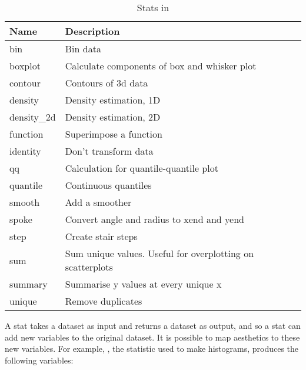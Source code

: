 \begin{table}
  \begin{center}
  \begin{tabular}{lp{3in}}
    \toprule
    Name & Description \\
    \midrule
    bin          & Bin data                                                   \\
    boxplot      & Calculate components of box and whisker plot               \\
    contour      & Contours of 3d data                                        \\
    density      & Density estimation, 1D                                     \\
    density\_2d & Density estimation, 2D                                     \\
    function     & Superimpose a function                                     \\
    identity     & Don't transform data                                       \\
    qq           & Calculation for quantile-quantile plot                     \\
    quantile     & Continuous quantiles                                       \\
    smooth       & Add a smoother                                             \\
    spoke        & Convert angle and radius to xend and yend                  \\
    step         & Create stair steps                                         \\
    sum          & Sum unique values.  Useful for overplotting on scatterplots\\
    summary      & Summarise y values at every unique x                       \\
    unique       & Remove duplicates                                          \\
    \bottomrule
  \end{tabular}
  \end{center}
  \caption{Stats in \ggplot}
  \label{tbl:stats}
\end{table}


A stat takes a dataset as input and returns a dataset as output, and so a stat can add new variables to the original dataset.  It is possible to map aesthetics to these new variables.  For example, , the statistic used to make histograms, produces the following variables:

